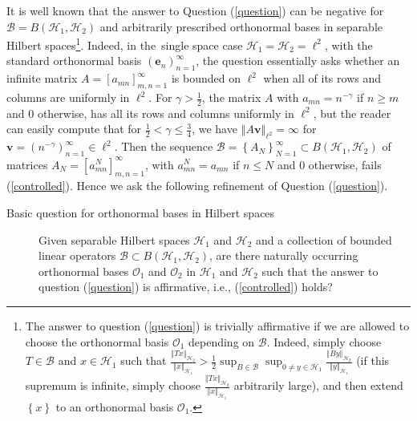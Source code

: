 \documentclass{amsart}%
\theoremstyle{plain}
\numberwithin{equation}{section}
\begin{document}
It is well known that the answer to Question (\ref{question}) can be negative for
$\mathcal{B}=B\left(  \mathcal{H}_{1},\mathcal{H}_{2}\right)  $ and
arbitrarily prescribed orthonormal bases in separable Hilbert
spaces\footnote{The answer to question (\ref{question}) is trivially
affirmative if we are allowed to choose the orthonormal basis $\mathcal{O}%
_{1}$ depending on $\mathcal{B}$. Indeed, simply choose $T\in\mathcal{B}$ and
$x\in\mathcal{H}_{1}$ such that $\frac{\left\Vert Tx\right\Vert _{\mathcal{H}%
_{2}}}{\left\Vert x\right\Vert _{\mathcal{H}_{1}}}>\frac{1}{2}\sup
_{B\in\mathcal{B}}\sup_{0\neq y\in\mathcal{H}_{1}}\frac{\left\Vert
By\right\Vert _{\mathcal{H}_{2}}}{\left\Vert y\right\Vert _{\mathcal{H}_{1}}}$
(if this supremum is infinite, simply choose $\frac{\left\Vert Tx\right\Vert
_{\mathcal{H}_{2}}}{\left\Vert x\right\Vert _{\mathcal{H}_{1}}}$ arbitrarily
large), and then extend $\left\{  x\right\}  $ to an orthonormal basis
$\mathcal{O}_{1}$.}. Indeed, in the\ single space case $\mathcal{H}%
_{1}=\mathcal{H}_{2}=\ell^{2}$, with the standard orthonormal basis $\left(
\mathbf{e}_{n}\right)  _{n=1}^{\infty}$, the question essentially asks
whether an infinite matrix $A=\left[  a_{mn}\right]  _{m,n=1}^{\infty}$
is bounded on $\ell^{2}$ when all of its rows and columns are uniformly in
$\ell^{2}$. For $\gamma>\frac{1}{2}$, the matrix $A$ with $a_{mn}=n^{-\gamma}$
if $n\geq m$ and $0$ otherwise, has all its rows and columns uniformly in
$\ell^{2}$, but the reader can easily compute that for $\frac{1}{2}<\gamma
\leq\frac{3}{4}$, we have $\left\Vert A\mathbf{v}\right\Vert _{\ell^{2}}=\infty$ for
$\mathbf{v}=\left(  n^{-\gamma}\right)  _{n=1}^{\infty}\in\ell^{2}$. Then the
sequence $\mathcal{B}=\left\{  A_{N}\right\}  _{N=1}^{\infty}\subset B\left(
\mathcal{H}_{1},\mathcal{H}_{2}\right)  $ of matrices $A_{N}=\left[
a_{mn}^{N}\right]  _{m,n=1}^{\infty}$, with $a_{mn}^{N}=a_{mn}$ if $n\leq N$
and $0$ otherwise, fails (\ref{controlled}). Hence we ask the following
refinement of Question (\ref{question}).

\begin{description}
\item[Basic question for orthonormal bases in Hilbert spaces] Given separable
Hilbert spaces $\mathcal{H}_{1}$ and $\mathcal{H}_{2}$ and a collection of
bounded linear operators $\mathcal{B}\subset B\left(  \mathcal{H}%
_{1},\mathcal{H}_{2}\right)  $, are there naturally occurring
orthonormal bases $\mathcal{O}_{1}$ and $\mathcal{O}_{2}$ in $\mathcal{H}_{1}$
and $\mathcal{H}_{2}$ such that the answer to question (\ref{question}) is
affirmative, i.e., (\ref{controlled}) holds?
\end{description}
\end{document}
